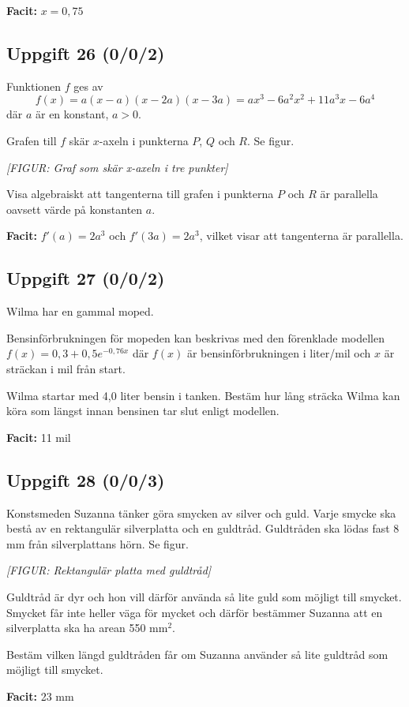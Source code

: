 \documentclass{article}
\begin{document}
\textbf{Facit:} $x = 0,75$

\subsection*{Uppgift 26 (0/0/2)}
Funktionen $f$ ges av
\[
f(x) = a(x - a)(x - 2a)(x - 3a) = ax^3 - 6a^2x^2 + 11a^3x - 6a^4
\]
där $a$ är en konstant, $a > 0$.

Grafen till $f$ skär $x$-axeln i punkterna $P$, $Q$ och $R$. Se figur.

\textit{[FIGUR: Graf som skär x-axeln i tre punkter]}

Visa algebraiskt att tangenterna till grafen i punkterna $P$ och $R$ är parallella oavsett värde på konstanten $a$.

\textbf{Facit:} $f'(a) = 2a^3$ och $f'(3a) = 2a^3$, vilket visar att tangenterna är parallella.

\subsection*{Uppgift 27 (0/0/2)}
Wilma har en gammal moped.

Bensinförbrukningen för mopeden kan beskrivas med den förenklade modellen $f(x) = 0,3 + 0,5e^{-0,76x}$ där $f(x)$ är bensinförbrukningen i liter/mil och $x$ är sträckan i mil från start.

Wilma startar med 4,0 liter bensin i tanken. Bestäm hur lång sträcka Wilma kan köra som längst innan bensinen tar slut enligt modellen.

\textbf{Facit:} 11 mil

\subsection*{Uppgift 28 (0/0/3)}
Konstsmeden Suzanna tänker göra smycken av silver och guld. Varje smycke ska bestå av en rektangulär silverplatta och en guldtråd. Guldtråden ska lödas fast 8 mm från silverplattans hörn. Se figur.

\textit{[FIGUR: Rektangulär platta med guldtråd]}

Guldtråd är dyr och hon vill därför använda så lite guld som möjligt till smycket. Smycket får inte heller väga för mycket och därför bestämmer Suzanna att en silverplatta ska ha arean 550 mm$^2$.

Bestäm vilken längd guldtråden får om Suzanna använder så lite guldtråd som möjligt till smycket.

\textbf{Facit:} 23 mm
\end{document}
